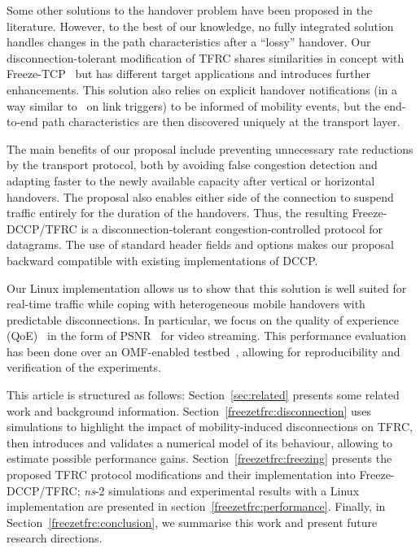 \documentclass[twocolumn]{nictatechreport}
\newcommand{\ns}{\textit{ns}}
\begin{document}
Some other solutions to the handover problem have been proposed in the
literature. However, to the best of our knowledge, no fully integrated solution
handles changes in the path characteristics after a ``lossy'' handover.  Our
disconnection-tolerant modification of TFRC shares similarities in concept with
Freeze-TCP~\cite{2000goff_freezetcp} but has different target applications and
introduces further enhancements.  This solution also relies on explicit handover
notifications (in a way similar
to~\cite{2006montavont_mipv6_link-network_interaction} on link triggers) to be
informed of mobility events, but the end-to-end path characteristics are then
discovered uniquely at the transport layer.

The main benefits of our proposal include preventing unnecessary rate reductions
by the transport protocol, both by avoiding false congestion detection and
adapting faster to the newly available capacity after vertical or horizontal
handovers. The proposal also enables either side of the connection to suspend
traffic entirely for the duration of the handovers. Thus, the resulting
Freeze-DCCP/TFRC is a disconnection-tolerant congestion-controlled protocol for
datagrams. The use of standard header fields and options makes our proposal
backward compatible with existing implementations of DCCP. 

Our Linux implementation allows us to show that this solution is well suited for
real-time traffic while coping with heterogeneous mobile handovers with
predictable disconnections.  In particular, we focus on the quality of
experience (QoE)~\cite{2008kilkki_qoe} in the form of PSNR~\cite{2001ansi_psnr}
for video streaming. This performance evaluation has been done over an
OMF-enabled testbed~\cite{2010rakotoarivelo_omf}, allowing for reproducibility
and verification of the experiments.

This article is structured as follows: Section~\ref{sec:related} presents some
related work and background information.  Section~\ref{freezetfrc:disconnection}
uses simulations to highlight the impact of mobility-induced disconnections on
TFRC, then introduces and validates a numerical model of its behaviour, allowing
to estimate possible performance gains. Section~\ref{freezetfrc:freezing}
presents the proposed TFRC protocol modifications and their implementation into
Freeze-DCCP/TFRC; \ns-2 simulations and experimental results with a Linux
implementation are presented in section~\ref{freezetfrc:performance}.  Finally,
in Section~\ref{freezetfrc:conclusion}, we summarise this work and present
future research directions.
\end{document}
